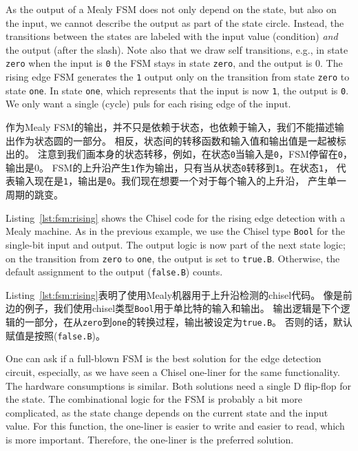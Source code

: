 \documentclass[%
    10pt,
    headinclude, footexclude,
    openright, %
    notitlepage,
    cleardoubleempty,
    headsepline,
    pointlessnumbers,
    bibtotoc, idxtotoc,
    ]{scrbook}
\newcommand{\code}[1]{{\small{\texttt{#1}}}}
\begin{document}
As the output of a Mealy FSM does not only depend on the state, but also
on the input, we cannot describe the output as part of the state circle.
Instead, the transitions between the states are labeled with the input
value (condition) \emph{and} the output (after the slash).
Note also that we draw self transitions, e.g., in state \code{zero} when
the input is \code{0} the FSM stays in state \code{zero}, and the output is {0}.
The rising edge FSM generates the \code{1} output only on the transition
from state \code{zero} to state \code{one}. In state \code{one}, which represents
that the input is now \code{1}, the output is \code{0}. We only want a single (cycle)
puls for each rising edge of the input.

作为Mealy FSM的输出，并不只是依赖于状态，也依赖于输入，我们不能描述输出作为状态圆的一部分。
相反，状态间的转移函数和输入值和输出值是一起被标出的。
注意到我们画本身的状态转移，例如，在状态\code{0}当输入是\code{0}，FSM停留在\code{0}，
输出是{0}。
FSM的上升沿产生\code{1}作为输出，只有当从状态\code{0}转移到\code{1}。在状态\code{1}，
代表输入现在是\code{1}，输出是\code{0}。我们现在想要一个对于每个输入的上升沿，
产生单一周期的跳变。


Listing~\ref{lst:fsm:rising} shows the Chisel code for the rising edge detection
with a Mealy machine.
As in the previous example, we use the Chisel type \code{Bool} for the
single-bit input and output.
The output logic is now part of the next state logic; on the transition from
\code{zero} to \code{one}, the output is set to \code{true.B}. Otherwise,
the default assignment to the output (\code{false.B}) counts.

Listing~\ref{lst:fsm:rising}表明了使用Mealy机器用于上升沿检测的chisel代码。
像是前边的例子，我们使用chisel类型\code{Bool}用于单比特的输入和输出。
输出逻辑是下个逻辑的一部分，在从\code{zero}到\code{one}的转换过程，输出被设定为\code{true.B}。
否则的话，默认赋值是按照(\code{false.B})。

One can ask if a full-blown FSM is the best solution for the edge detection circuit,
especially, as we have seen a Chisel one-liner for the same functionality.
The hardware consumptions is similar. Both solutions need a single D flip-flop
for the state. The combinational logic for the FSM is probably a bit more complicated, as
the state change depends on the current state and the input value.
For this function, the one-liner is easier to write and easier to read,
which is more important. Therefore, the one-liner is the preferred solution.
\end{document}
